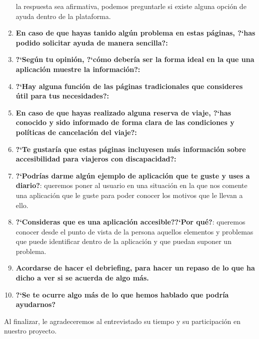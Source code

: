 \begin{enumerate}
                la respuesta sea afirmativa, podemos preguntarle si existe alguna opción de ayuda dentro de la plataforma.
    \item {\textbf{En caso de que hayas tanido algún problema en estas páginas, ?`has podido solicitar ayuda de manera sencilla?:}}
    \item {\textbf{?`Según tu opinión, ?`cómo debería ser la forma ideal en la que una aplicación muestre la información?:}}
    \item {\textbf{?`Hay alguna función de las páginas tradicionales que consideres útil para tus necesidades?:}}
    \item {\textbf{En caso de que hayas realizado alguna reserva de viaje, ?`has conocido y sido informado de forma clara de las condiciones
                        y políticas de cancelación del viaje?:}}
    \item {\textbf{?`Te gustaría que estas páginas incluyesen más información sobre accesibilidad para viajeros con discapacidad?:}}
    \item {\textbf{?`Podrías darme algún ejemplo de aplicación que te guste y uses a diario?}}: queremos poner al usuario en una situación
    en la que nos comente una aplicación que le guste para poder conocer los motivos que le llevan a ello.
    \item {\textbf{?`Consideras que es una aplicación accesible??`Por qué?}}: queremos conocer desde el punto de vista de la persona aquellos
    elementos y problemas que puede identificar dentro de la aplicación y que puedan suponer un problema.
    \item {\textbf{Acordarse de hacer el debriefing, para hacer un repaso de lo que ha dicho a ver si se acuerda de algo más.}}
    \item {\textbf{?`Se te ocurre algo más de lo que hemos hablado que podría ayudarnos?}}
\end{enumerate}

Al finalizar, le agradeceremos al entrevistado su tiempo y su participación en nuestro proyecto.
